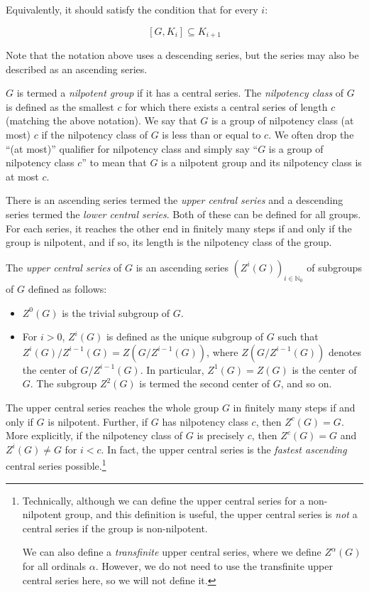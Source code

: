 \documentclass{ucetd}
\begin{document}
Equivalently, it should satisfy the condition that for every $i$:

$$[G,K_i] \subseteq K_{i+1}$$

Note that the notation above uses a descending series, but the series
may also be described as an ascending series.

$G$ is termed a {\em nilpotent group} if it has a central series. The
{\em nilpotency class} of $G$ is defined as the smallest $c$ for which
there exists a central series of length $c$ (matching the above
notation). We say that $G$ is a group of nilpotency class (at most)
$c$ if the nilpotency class of $G$ is less than or equal to $c$. We
often drop the ``(at most)'' qualifier for nilpotency class and simply
say ``$G$ is a group of nilpotency class $c$'' to mean that $G$ is a
nilpotent group and its nilpotency class is at most $c$.

There is an ascending series termed the {\em upper central series} and
a descending series termed the {\em lower central series}. Both
of these can be defined for all groups. For each series, it reaches
the other end in finitely many steps if and only if the group is
nilpotent, and if so, its length is the nilpotency class of the group.

The {\em upper central series} of $G$ is an ascending series
$(Z^i(G))_{i \in \mathbb{N}_0}$ of subgroups of $G$ defined as
follows:

\begin{itemize}
\item $Z^0(G)$ is the trivial subgroup of $G$.
\item For $i > 0$, $Z^i(G)$ is defined as the unique subgroup of $G$
  such that $Z^i(G)/Z^{i-1}(G) = Z(G/Z^{i-1}(G))$, where
  $Z(G/Z^{i-1}(G))$ denotes the center of $G/Z^{i-1}(G)$. In
  particular, $Z^1(G) = Z(G)$ is the center of $G$. The subgroup
  $Z^2(G)$ is termed the second center of $G$, and so on.
\end{itemize}

The upper central series reaches the whole group $G$ in finitely many
steps if and only if $G$ is nilpotent. Further, if $G$ has nilpotency
class $c$, then $Z^c(G) = G$. More explicitly, if the nilpotency class
of $G$ is precisely $c$, then $Z^c(G) = G$ and $Z^i(G) \ne G$ for $i <
c$. In fact, the upper central series is the {\em fastest ascending}
central series possible.\footnote{Technically, although we can define
  the upper central series for a non-nilpotent group, and this
  definition is useful, the upper central series is {\em not} a
  central series if the group is non-nilpotent.

We can also define a {\em transfinite} upper central series, where we
define $Z^\alpha(G)$ for all ordinals $\alpha$. However, we do not
need to use the transfinite upper central series here, so we will not
define it.}
\end{document}
